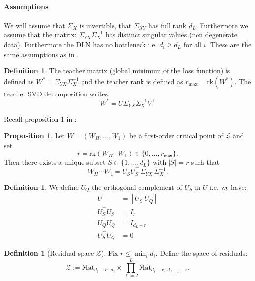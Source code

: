 \documentclass{article}
\theoremstyle{definition}
\newtheorem{proposition}[theorem]{Proposition}
\newtheorem{definition}[theorem]{Definition}
\begin{document}
\paragraph{Assumptions} We will assume that $\Sigma_X$ is invertible, that $\Sigma_{XY}$ has full rank $d_L$. Furthermore we assume that the matrix: $\Sigma_{YX}\Sigma_X^{-1}$ has distinct singular values (non degenerate data). Furthermore the DLN has no bottleneck i.e. $d_i \geq d_L$ for all $i$. These are the same assumptions as in \cite{achour2024loss}. 
\begin{definition}
    The teacher matrix (global minimum of the loss function) is defined as $W^* = \Sigma_{YX}\Sigma_X^{-1}$ and the teacher rank is defined as $r_{\max} = \text{rk}(W^*)$. The teacher SVD decomposition writes:
    \begin{equation*}
        W^* = U \Sigma_{YX}\Sigma_X^{-1} V^\top
    \end{equation*}
\end{definition}
\noindent
Recall proposition 1 in \cite{achour2024loss}:
\begin{proposition}
Let $W = (W_H, \dots, W_1)$ be a first-order critical point of $\mathcal{L}$ and set
\[
r = \text{rk}(W_H \cdots W_1) \in \{ 0, \dots, r_{\max} \}.
\]
Then there exists a unique subset $S \subset \{ 1, \dots, d_L \}$ with $|S| = r$ such that
\[
W_H \cdots W_1 = U_S U_S^\top \, \Sigma_{YX} \, \Sigma_{X}^{-1}.
\]
\end{proposition}
\begin{definition}
We define $U_Q$ the orthogonal complement of $U_S$ in $U$ i.e. we have:
\begin{align*}
    U  & = [U_S \; U_Q] \\
    U_S^{\top}U_S & = I_r \\
    U_Q^{\top}U_Q & = I_{d_L-r} \\
    U_S^{\top}U_Q & = 0
\end{align*}
\end{definition}
\begin{definition}[Residual space $\mathcal Z$]
Fix $r \le \min_i d_i$. Define the space of residuals:
\[
\mathcal Z
:=
\mathrm{Mat}_{d_1 - r,\; d_0}
\times
\prod_{\ell=2}^{L   }
\mathrm{Mat}_{d_\ell - r,\; d_{\ell-1} - r}.
\]
\end{definition}
\end{document}
